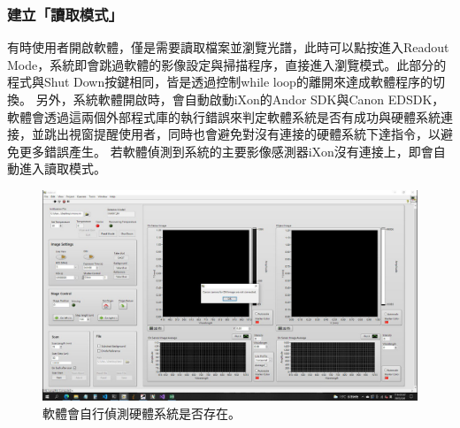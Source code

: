 \documentclass[12pt]{article}
\begin{document}
\subsubsection{建立「讀取模式」}
有時使用者開啟軟體，僅是需要讀取檔案並瀏覽光譜，此時可以點按進入Readout Mode，系統即會跳過軟體的影像設定與掃描程序，直接進入瀏覽模式。此部分的程式與Shut Down按鍵相同，皆是透過控制while loop的離開來達成軟體程序的切換。
另外，系統軟體開啟時，會自動啟動iXon的Andor SDK與Canon EDSDK，軟體會透過這兩個外部程式庫的執行錯誤來判定軟體系統是否有成功與硬體系統連接，並跳出視窗提醒使用者，同時也會避免對沒有連接的硬體系統下達指令，以避免更多錯誤產生。
若軟體偵測到系統的主要影像感測器iXon沒有連接上，即會自動進入讀取模式。
\begin{figure}[ht]
    \centering
    \includegraphics[width=\linewidth]{detectHW.jpeg}
    \caption{軟體會自行偵測硬體系統是否存在。}
    \label{figure: detect hardware}
\end{figure}
\end{document}
